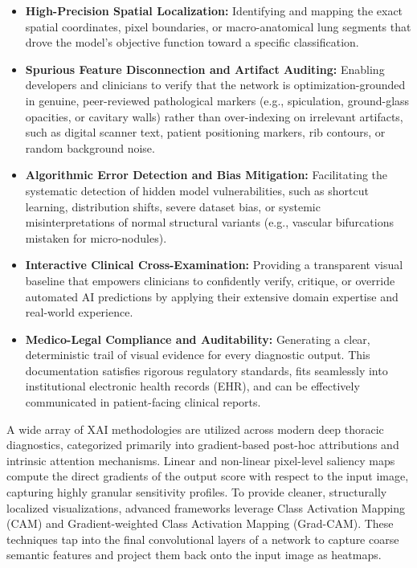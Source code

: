 \begin{itemize}
	\item \textbf{High-Precision Spatial Localization:} Identifying and mapping the exact spatial coordinates, pixel boundaries, or macro-anatomical lung segments that drove the model's objective function toward a specific classification.
	\item \textbf{Spurious Feature Disconnection and Artifact Auditing:} Enabling developers and clinicians to verify that the network is optimization-grounded in genuine, peer-reviewed pathological markers (e.g., spiculation, ground-glass opacities, or cavitary walls) rather than over-indexing on irrelevant artifacts, such as digital scanner text, patient positioning markers, rib contours, or random background noise.
	\item \textbf{Algorithmic Error Detection and Bias Mitigation:} Facilitating the systematic detection of hidden model vulnerabilities, such as shortcut learning, distribution shifts, severe dataset bias, or systemic misinterpretations of normal structural variants (e.g., vascular bifurcations mistaken for micro-nodules).
	\item \textbf{Interactive Clinical Cross-Examination:} Providing a transparent visual baseline that empowers clinicians to confidently verify, critique, or override automated AI predictions by applying their extensive domain expertise and real-world experience.
	\item \textbf{Medico-Legal Compliance and Auditability:} Generating a clear, deterministic trail of visual evidence for every diagnostic output. This documentation satisfies rigorous regulatory standards, fits seamlessly into institutional electronic health records (EHR), and can be effectively communicated in patient-facing clinical reports.
\end{itemize}

A wide array of XAI methodologies are utilized across modern deep thoracic diagnostics, categorized primarily into gradient-based post-hoc attributions and intrinsic attention mechanisms. Linear and non-linear pixel-level saliency maps compute the direct gradients of the output score with respect to the input image, capturing highly granular sensitivity profiles. To provide cleaner, structurally localized visualizations, advanced frameworks leverage Class Activation Mapping (CAM) and Gradient-weighted Class Activation Mapping (Grad-CAM). These techniques tap into the final convolutional layers of a network to capture coarse semantic features and project them back onto the input image as heatmaps. 

